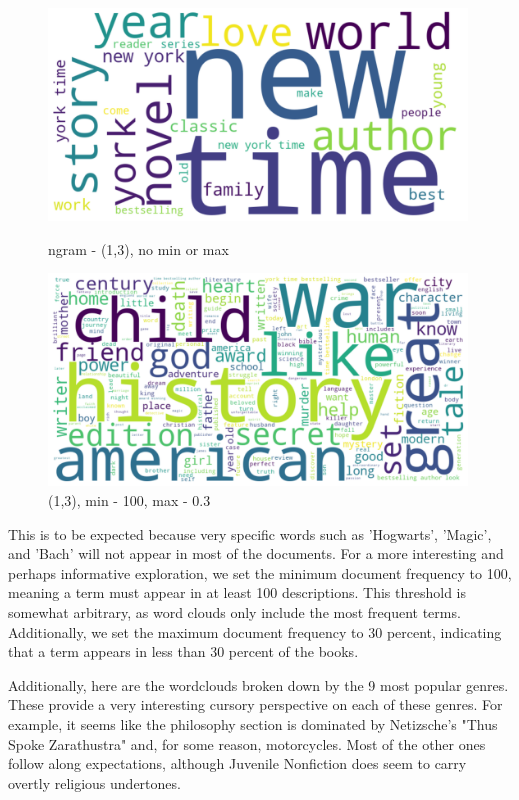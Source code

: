 \documentclass[12pt]{article}
\numberwithin{equation}{section}
\begin{document}
\begin{figure}[b]
\begin{minipage}[b]{0.49\linewidth}
    \centering
    \includegraphics[width=0.99\textwidth]{description_wc.png}
    \caption{ngram - (1,3), no min or max}
    \end{minipage}
        \hspace{0.01cm}
 \begin{minipage}[b]{0.49\linewidth}
    \centering
    \includegraphics[width=0.99\textwidth]{descrip_wc.png}
    \caption{(1,3), min - 100, max - 0.3}
 \end{minipage}
 \end{figure} 

This is to be expected because very specific words such as 'Hogwarts', 'Magic', and 'Bach' will not appear in most of the documents. For a more interesting and perhaps informative exploration, we set the minimum document frequency to 100, meaning a term must appear in at least 100 descriptions. This threshold is somewhat arbitrary, as word clouds only include the most frequent terms. Additionally, we set the maximum document frequency to 30 percent, indicating that a term appears in less than 30 percent of the books.

Additionally, here are the wordclouds broken down by the 9 most popular genres. These provide a very interesting cursory perspective on each of these genres. For example, it seems like the philosophy section is dominated by Netizsche's "Thus Spoke Zarathustra" and, for some reason, motorcycles. Most of the other ones follow along expectations, although Juvenile Nonfiction does seem to carry overtly religious undertones.
\end{document}
